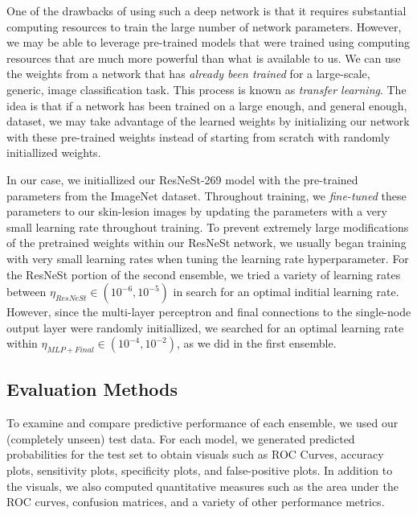 \documentclass [MAS] {uclathes}
\begin{document}
One of the drawbacks of using such a deep network is that it requires substantial computing resources to train the large number of network parameters. However, we may be able to leverage pre-trained models that were trained using computing resources that are much more powerful than what is available to us. We can use the weights from a network that has \textit{already been trained} for a large-scale, generic, image classification task. This process is known as \textit{transfer learning}. The idea is that if a network has been trained on a large enough, and general enough, dataset, we may take advantage of the learned weights by initializing our network with these pre-trained weights instead of starting from scratch with randomly initiallized weights. 

In our case, we initiallized our ResNeSt-269 model with the pre-trained parameters from the ImageNet dataset. Throughout training, we \textit{fine-tuned} these parameters to our skin-lesion images by updating the parameters with a very small learning rate throughout training. To prevent extremely large modifications of the pretrained weights within our ResNeSt network, we usually began training with very small learning rates when tuning the learning rate hyperparameter. For the ResNeSt portion of the second ensemble, we tried a variety of learning rates between $\eta_{ResNeSt} \in (10^{-6}, 10^{-5})$ in search for an optimal inditial learning rate. However, since the multi-layer perceptron and final connections to the single-node output layer were randomly initiallized, we searched for an optimal learning rate within $\eta_{MLP + Final} \in (10^{-4}, 10^{-2})$, as we did in the first ensemble. 


\subsection{Evaluation Methods}

To examine and compare predictive performance of each ensemble, we used our (completely unseen) test data. For each model, we generated predicted probabilities for the test set to obtain visuals such as ROC Curves, accuracy plots, sensitivity plots, specificity plots, and false-positive plots. In addition to the visuals, we also computed quantitative measures such as the area under the ROC curves, confusion matrices, and a variety of other performance metrics. 
\end{document}
